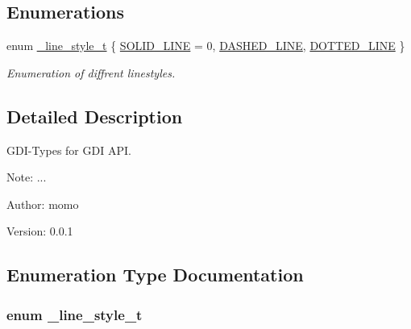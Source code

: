 \subsection*{Enumerations}
\begin{CompactItemize}
\item 
enum \hyperlink{group__hgdi__types_g8f4f6dec94a8b54dc690018424721e38}{\_\-line\_\-style\_\-t} \{ \hyperlink{group__hgdi__types_gg8f4f6dec94a8b54dc690018424721e38b67c7ec0d0b78acc6149f78bb54ebbb4}{SOLID\_\-LINE} =  0, 
\hyperlink{group__hgdi__types_gg8f4f6dec94a8b54dc690018424721e38e6560d9a7befef651165597a24779857}{DASHED\_\-LINE}, 
\hyperlink{group__hgdi__types_gg8f4f6dec94a8b54dc690018424721e386f0bcfa7a60895325f0522357956a9b6}{DOTTED\_\-LINE}
 \}
\begin{CompactList}\small\item\em Enumeration of diffrent linestyles. \item\end{CompactList}\end{CompactItemize}


\subsection{Detailed Description}
GDI-Types for GDI API. 

\begin{Desc}
\item[Note:]... \end{Desc}
\begin{Desc}
\item[Author:]momo \end{Desc}
\begin{Desc}
\item[Version:]0.0.1 \end{Desc}


\subsection{Enumeration Type Documentation}
\hypertarget{group__hgdi__types_g8f4f6dec94a8b54dc690018424721e38}{
\subsubsection[{\_\-line\_\-style\_\-t}]{\setlength{\rightskip}{0pt plus 5cm}enum {\bf \_\-line\_\-style\_\-t}}}
\label{group__hgdi__types_g8f4f6dec94a8b54dc690018424721e38}


